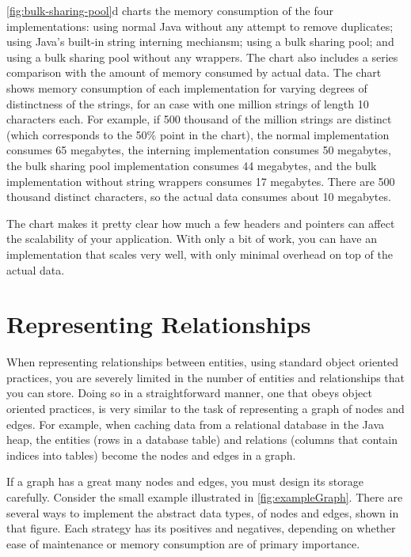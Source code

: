 \autoref{fig:bulk-sharing-pool}d charts the memory consumption of the four
implementations: using normal Java  without any attempt to remove
duplicates; using Java's built-in string interning mechiansm; using a bulk
sharing pool; and using a bulk sharing pool without any  wrappers.
The chart also includes a series comparison with the amount of memory consumed by
actual data.  The chart shows memory consumption of each implementation for
varying degrees of distinctness of the strings, for an case with one million
strings of length 10 characters each.
For example, if 500 thousand of the million strings are distinct (which
corresponds to the 50\% point in the chart), the normal implementation consumes
65 megabytes, the interning implementation consumes 50 megabytes, the bulk
sharing pool implementation consumes 44 megabytes, and the bulk implementation
without string wrappers consumes 17 megabytes. There are 500 thousand
distinct characters, so the actual data consumes about 10 megabytes.

The chart makes it pretty clear how much a few headers and pointers can affect
the scalability of your application. With only a bit of work, you can have an
implementation that scales very well, with only minimal overhead on top of the
actual data.

\section{Representing Relationships}

When representing relationships between entities, using standard object oriented
practices, you are severely limited in the number of entities and relationships
that you can store. Doing so in a straightforward manner, one that obeys object
oriented practices, is very similar to the task of representing a graph of nodes
and edges. For example, when caching data from a relational database in the Java
heap, the entities (rows in a database table) and relations (columns that contain
indices into tables) become the nodes and edges in a graph.

If a graph has a great many nodes and edges, you must design its storage
carefully. Consider the small example illustrated in 
\autoref{fig:exampleGraph}. There are several ways to implement the abstract
data types, of nodes and edges, shown in that figure. Each strategy has its
positives and negatives, depending on whether ease of maintenance or memory
consumption are of primary importance.

